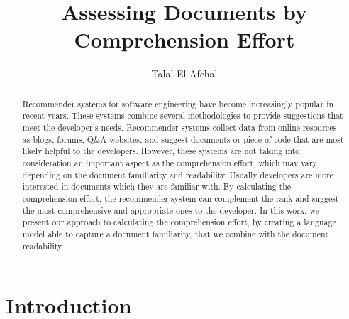 \documentclass[12pt,mscthesis]{usiinfthesis}
\title{Assessing Documents by Comprehension Effort } %
\author{Talal El Afchal} %
\begin{document}
\maketitle %

\frontmatter %

\begin{abstract}
Recommender systems for software engineering have become increasingly popular in recent years. These systems combine several methodologies to provide suggestions that meet the developer's needs. Recommender systems collect data from online resources as blogs, forums, Q\&A websites, and suggest documents or piece of code that are most likely helpful to the developers. However, these systems are not taking into consideration an important aspect as the comprehension effort, which may vary depending on the document familiarity and readability. Usually developers are more interested in documents which they are familiar with. By calculating the comprehension effort, the recommender system can complement the rank and suggest the most comprehensive and appropriate ones to the developer. In this work, we present our approach to calculating the comprehension effort, by creating a language model able to capture a document familiarity, that we combine with the document readability. 
\end{abstract}

\begin{acknowledgements}
\end{acknowledgements}

\tableofcontents 
\listoffigures %
\listoftables %

\mainmatter

\chapter{Introduction}
\end{document}
